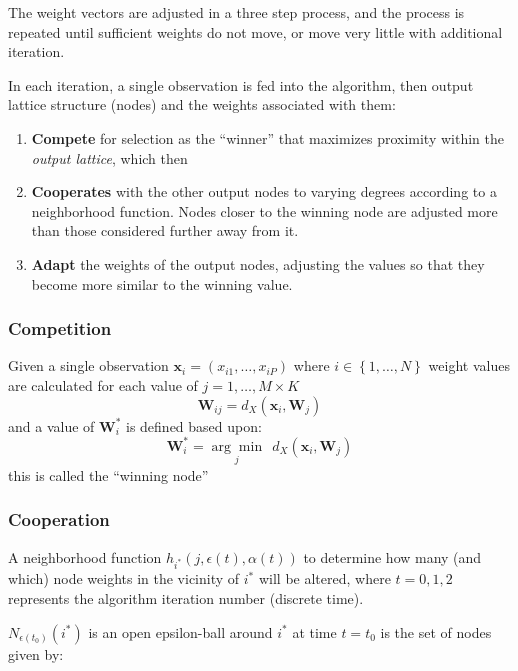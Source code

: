\documentclass[12pt,]{article}
\providecommand{\tightlist}{%
  \setlength{\itemsep}{0pt}\setlength{\parskip}{0pt}}
\begin{document}
The weight vectors are adjusted in a three step process, and the process
is repeated until sufficient weights do not move, or move very little
with additional iteration.

In each iteration, a single observation is fed into the algorithm, then
output lattice structure (nodes) and the weights associated with them:

\begin{enumerate}
\def\labelenumi{\arabic{enumi}.}
\tightlist
\item
  \textbf{Compete} for selection as the ``winner'' that maximizes
  proximity within the \textit{output lattice}, which then
\item
  \textbf{Cooperates} with the other output nodes to varying degrees
  according to a neighborhood function. Nodes closer to the winning node
  are adjusted more than those considered further away from it.
\item
  \textbf{Adapt} the weights of the output nodes, adjusting the values
  so that they become more similar to the winning value.
\end{enumerate}

\hypertarget{competition}{%
\subsubsection{Competition}\label{competition}}

Given a single observation
\(\mathbf{x}_{i} = \left( x_{i1}, \ldots, x_{iP} \right)\) where
\(i\in\left \{ 1, \ldots, N\right \}\) weight values are calculated for
each value of \(j = 1, \ldots, M \times K\)
\[\mathbf{W}_{ij}= d_{X} \left( \mathbf{x}_{i}, \mathbf{W}_{j} \right)\]
and a value of \(\mathbf{W}_{i}^*\) is defined based upon:
\[\mathbf{W}_{i}^*=\underset{j}{\arg\min} \ \ d_{X} \left( \mathbf{x}_{i}, \mathbf{W}_{j} \right) \]
this is called the ``winning node''

\hypertarget{cooperation}{%
\subsubsection{Cooperation}\label{cooperation}}

A neighborhood function \(h_{i^{*}}(j, \epsilon(t), \alpha(t))\) to
determine how many (and which) node weights in the vicinity of \(i^{*}\)
will be altered, where \(t=0,1,2\) represents the algorithm iteration
number (discrete time).

\(N_{\epsilon(t_{0})}(i^{*})\) is an open epsilon-ball around \(i^{*}\)
at time \(t=t_{0}\) is the set of nodes given by:
\end{document}
